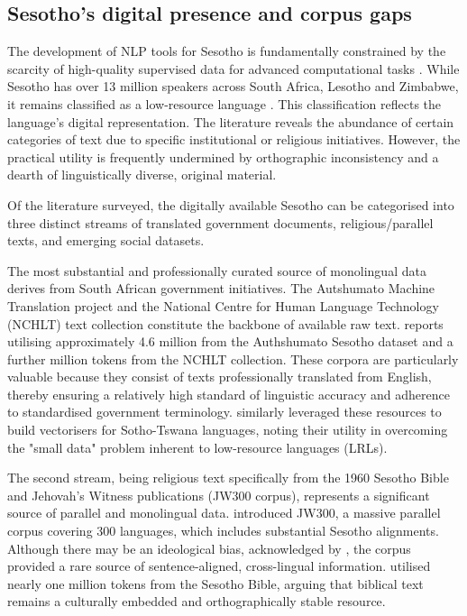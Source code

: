 \documentclass[12pt]{ThesisRU}
\begin{document}
\subsection{Sesotho's digital presence and corpus gaps}
The development of NLP tools for Sesotho is fundamentally constrained by the scarcity of high-quality supervised data for advanced computational tasks \citep{sibeko2022overview}. While Sesotho has over 13 million speakers across South Africa, Lesotho and Zimbabwe, it remains classified as a low-resource language \citep{mokhosi2024sesotho}. This classification reflects the language's digital representation. The literature reveals the abundance of certain categories of text due to specific institutional or religious initiatives. However, the practical utility is frequently undermined by orthographic inconsistency and a dearth of linguistically diverse, original material.

Of the literature surveyed, the digitally available Sesotho can be categorised into three distinct streams of translated government documents, religious/parallel texts, and emerging social datasets.

The most substantial and professionally curated source of monolingual data derives from South African government initiatives. The Autshumato Machine Translation project and the National Centre for Human Language Technology (NCHLT) text collection constitute the backbone of available raw text. \citet{Sibeko2024} reports utilising approximately 4.6 million from the Authshumato Sesotho dataset and a further million tokens from the NCHLT collection. These corpora are particularly valuable because they consist of texts professionally translated from English, thereby ensuring a relatively high standard of linguistic accuracy and adherence to standardised government terminology. \citet{marivate2020investigating} similarly leveraged these resources to build vectorisers for Sotho-Tswana languages, noting their utility in overcoming the "small data" problem inherent to low-resource languages (LRLs).

The second stream, being religious text specifically from the 1960 Sesotho Bible and Jehovah's Witness publications (JW300 corpus), represents a significant source of parallel and monolingual data. \citet{agic2019jw300} introduced JW300, a massive parallel corpus covering 300 languages, which includes substantial Sesotho alignments. Although there may be an ideological bias, acknowledged by \citet{agic2019jw300}, the corpus provided a rare source of sentence-aligned, cross-lingual information. \citet{Sibeko2024} utilised nearly one million tokens from the Sesotho Bible, arguing that biblical text remains a culturally embedded and orthographically stable resource.
\end{document}
